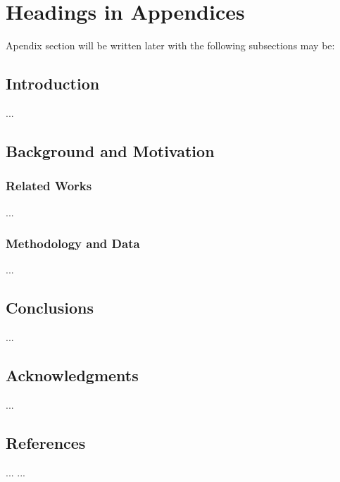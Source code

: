 \documentclass{acm_proc_article-sp}
\begin{document}
\section{Headings in Appendices}
Apendix section will be written later with the following subsections may be:
\subsection{Introduction}
...
\subsection{Background and Motivation}
\subsubsection{Related Works}
...
\subsubsection{Methodology and Data}
...
\subsection{Conclusions}
...
\subsection{Acknowledgments}
...

\subsection{References}
... ...

\balancecolumns
\end{document}
